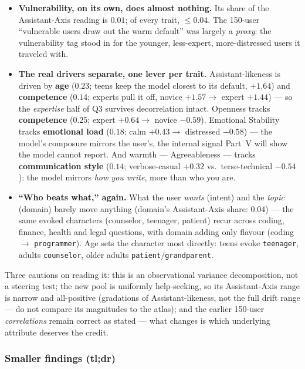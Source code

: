 \documentclass[11pt]{article}
\begin{document}
\begin{itemize}
  \item \textbf{Vulnerability, on its own, does almost nothing.} Its share of
        the Assistant-Axis reading is $0.01$; of every trait, $\le 0.04$. The
        150-user ``vulnerable users draw out the warm default'' was largely a
        \emph{proxy}: the vulnerability tag stood in for the younger,
        less-expert, more-distressed users it traveled with.
  \item \textbf{The real drivers separate, one lever per trait.}
        Assistant-likeness is driven by \textbf{age} ($0.23$; teens keep the
        model closest to its default, $+1.64$) and \textbf{competence}
        ($0.14$; experts pull it off, novice $+1.57 \to$ expert $+1.44$) ---
        so the \emph{expertise} half of Q3 survives decorrelation intact.
        Openness tracks \textbf{competence} ($0.25$; expert $+0.64 \to$
        novice $-0.59$). Emotional Stability tracks \textbf{emotional load}
        ($0.18$; calm $+0.43 \to$ distressed $-0.58$) --- the model's
        composure mirrors the user's, the internal signal Part~V will show
        the model cannot report. And warmth --- Agreeableness --- tracks
        \textbf{communication style} ($0.14$; verbose-casual $+0.32$ vs.\
        terse-technical $-0.54$): the model mirrors \emph{how you write},
        more than who you are.
  \item \textbf{``Who beats what,'' again.} What the user \emph{wants}
        (intent) and the \emph{topic} (domain) barely move anything (domain's
        Assistant-Axis share: $0.04$) --- the same evoked characters
        (counselor, teenager, patient) recur across coding, finance, health
        and legal questions, with domain adding only flavour (coding $\to$
        \texttt{programmer}). Age sets the character most directly: teens
        evoke \texttt{teenager}, adults \texttt{counselor}, older adults
        \texttt{patient}/\texttt{grandparent}.
\end{itemize}

Three cautions on reading it: this is an observational variance decomposition,
not a steering test; the new pool is uniformly help-seeking, so its
Assistant-Axis range is narrow and all-positive (gradations of
Assistant-likeness, not the full drift range --- do not compare its magnitudes
to the atlas); and the earlier 150-user \emph{correlations} remain correct as
stated --- what changes is which underlying attribute deserves the credit.

\subsubsection{Smaller findings (tl;dr)}
\end{document}
